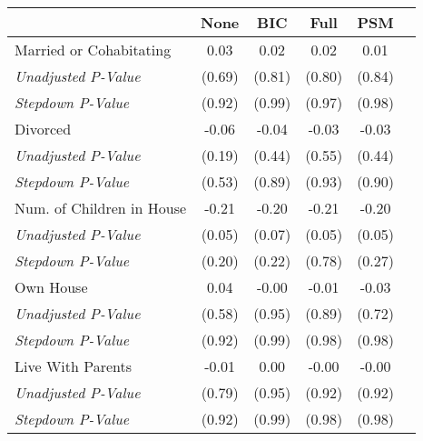 \begin{tabular}{l c c c c c}
\toprule
 & None & BIC & Full & PSM \\
\midrule
Married or Cohabitating & 0.03 & 0.02 & 0.02 & 0.01 \\
\quad \textit{Unadjusted P-Value} & (0.69) & (0.81) & (0.80) & (0.84) \\
\quad \textit{Stepdown P-Value} & (0.92) & (0.99) & (0.97) & (0.98) \\
Divorced & -0.06 & -0.04 & -0.03 & -0.03 \\
\quad \textit{Unadjusted P-Value} & (0.19) & (0.44) & (0.55) & (0.44) \\
\quad \textit{Stepdown P-Value} & (0.53) & (0.89) & (0.93) & (0.90) \\
Num. of Children in House & -0.21 & -0.20 & -0.21 & -0.20 \\
\quad \textit{Unadjusted P-Value} & (0.05) & (0.07) & (0.05) & (0.05) \\
\quad \textit{Stepdown P-Value} & (0.20) & (0.22) & (0.78) & (0.27) \\
Own House & 0.04 & -0.00 & -0.01 & -0.03 \\
\quad \textit{Unadjusted P-Value} & (0.58) & (0.95) & (0.89) & (0.72) \\
\quad \textit{Stepdown P-Value} & (0.92) & (0.99) & (0.98) & (0.98) \\
Live With Parents & -0.01 & 0.00 & -0.00 & -0.00 \\
\quad \textit{Unadjusted P-Value} & (0.79) & (0.95) & (0.92) & (0.92) \\
\quad \textit{Stepdown P-Value} & (0.92) & (0.99) & (0.98) & (0.98) \\
\bottomrule
\end{tabular}
